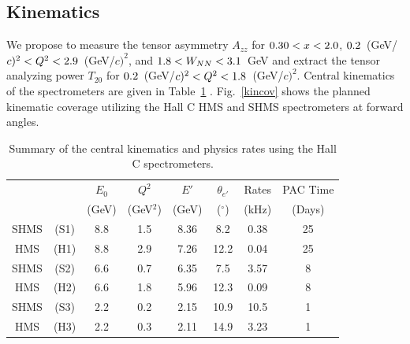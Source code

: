 \subsection{Kinematics}
\label{kinematics}

\label{EXP}
We propose to measure the tensor asymmetry $A_{zz}$ for $0.30<x<2.0$, $0.2$~(GeV/$c)^2 < Q^2 <2.9$~(GeV/$c)^2$, and $1.8 < W_{NN} < 3.1$~GeV and extract the tensor analyzing power $T_{20}$ for $\QMINT20$~(GeV/$c)^2 < Q^2 <\QMAXT20$~(GeV/$c)^2$. Central kinematics of the spectrometers are given in Table~\ref{RATES1}
. Fig.~\ref{kincov} shows the planned kinematic coverage utilizing the Hall C HMS and SHMS spectrometers at forward angles. 

\begin{table}
\begin{center}
\begin{tabular}{cc|c|c|c|c|c|c}
 & & $E_0$ & $Q^2$    	& $E'$  &    $\theta_{e'}$  &  Rates   & PAC Time   \\
& & (GeV) & (GeV$^2$)  & (GeV)  &     ($^{\circ}$)   &   (kHz)  & (Days) \\
\hline\hline
SHMS & (S1) & 8.8	&  1.5	&  8.36	&    8.2  	&    0.38	&   25 \\
HMS  & (H1) & 8.8	&  2.9	&  7.26	&    12.2	&    0.04	&   25 \\  
SHMS & (S2) & 6.6	&  0.7	&  6.35	&    7.5 	&    3.57	&   8 \\
HMS  & (H2) & 6.6	&  1.8	&  5.96	&    12.3	&    0.09	&   8 \\  
SHMS & (S3) & 2.2	&  0.2	&  2.15	&    10.9 	&    10.5	&   1 \\
HMS  & (H3) & 2.2	&  0.3	&  2.11	&    14.9	&    3.23	&   1 \\  
\hline\hline
\end{tabular}
\caption{\label{RATES1}Summary of the central kinematics and physics rates using the Hall C spectrometers.}
\end{center}
\end{table}










